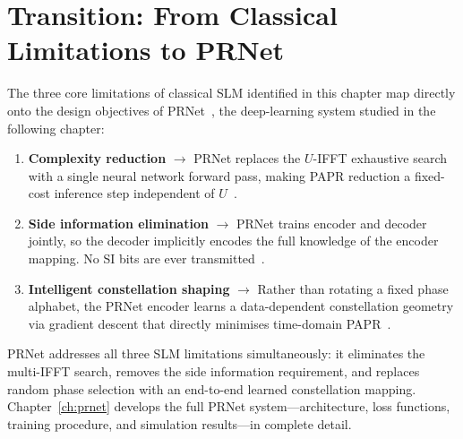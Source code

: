\section{Transition: From Classical Limitations to PRNet}

The three core limitations of classical SLM identified in this chapter map directly onto the design objectives of PRNet~\cite{kim2017novel}, the deep-learning system studied in the following chapter:
\begin{enumerate}
    \item \textbf{Complexity reduction} $\longrightarrow$ PRNet replaces the $U$-IFFT exhaustive search with a single neural network forward pass, making PAPR reduction a fixed-cost inference step independent of $U$~\cite{kim2017novel}.
    \item \textbf{Side information elimination} $\longrightarrow$ PRNet trains encoder and decoder jointly, so the decoder implicitly encodes the full knowledge of the encoder mapping. No SI bits are ever transmitted~\cite{kim2017novel}.
    \item \textbf{Intelligent constellation shaping} $\longrightarrow$ Rather than rotating a fixed phase alphabet, the PRNet encoder learns a data-dependent constellation geometry via gradient descent that directly minimises time-domain PAPR~\cite{kim2017novel}.
\end{enumerate}

\begin{keyinsight}
    PRNet addresses all three SLM limitations simultaneously: it eliminates the multi-IFFT search, removes the side information requirement, and replaces random phase selection with an end-to-end learned constellation mapping.  Chapter~\ref{ch:prnet} develops the full PRNet system---architecture, loss functions, training procedure, and simulation results---in complete detail.
\end{keyinsight}
